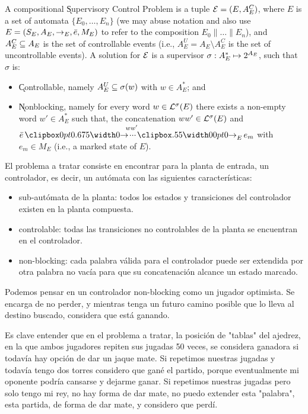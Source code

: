 \begin{definition} \label{def:control-problem}
	A compositional \k{Supervisory Control Problem} is a tuple $\mathcal{E} = (E, A_E^C)$, where $E$ is a set of automata $\{E_0,\ldots,E_n\}$ (we may abuse notation and also use $E = (S_E,A_E,\rightarrow_E,\bar{e},M_E)$ to refer to the composition $E_0\|\ldots\|E_n$), and $A_E^C \subseteq A_E$ is the set of controllable events (i.e., $A_E^U = A_E \setminus A_E^C$ is the set of uncontrollable events).
	A solution for $\mathcal{E}$ is a supervisor $\sigma : A_E^* \mapsto 2^{A_E}$, such that $\sigma$ is:
	\begin{itemize}[itemsep=4pt,topsep=-8pt]
		
		\item \k{Controllable}, namely $A_E^U \subseteq \sigma(w)$ with $w \in A_E^*$; and
		
		\item \k{Nonblocking}, namely for every word $w \in \mathcal{L}^\sigma(E)$ there exists a non-empty word $w' \in A_E^*$ such that, the concatenation $ww' \in \mathcal{L}^\sigma(E)$ and $\init{e} \runw{\;ww'}{E} e_m$ with $e_m \in M_E$ (i.e., a marked state of $E$).
		
	\end{itemize}
	
\end{definition}


El problema a tratar consiste en encontrar para la planta de entrada, un controlador, es decir, un autómata con las siguientes características:

\begin{itemize}
	\item sub-autómata de la planta: todos los estados y transiciones del controlador existen en la planta compuesta.
	
	\item controlable: todas las transiciones no controlables de la planta se encuentran en el controlador.
	
	\item non-blocking: cada palabra válida para el controlador puede ser extendida por otra palabra no vacía para que su concatenación alcance un estado marcado.
\end{itemize}

Podemos pensar en un controlador non-blocking como un jugador optimista. Se encarga de no perder, y mientras tenga un futuro camino posible que lo lleva al destino buscado, considera que está ganando.

Es clave entender que en el problema a tratar, la posición de "tablas" del ajedrez, en la que ambos jugadores repiten sus jugadas 50 veces, se considera ganadora si todavía hay opción de dar un jaque mate. Si repetimos nuestras jugadas y todavía tengo dos torres considero que gané el partido, porque eventualmente mi oponente podría cansarse y dejarme ganar. Si repetimos nuestras jugadas pero solo tengo mi rey, no hay forma de dar mate, no puedo extender esta "palabra", esta partida, de forma de dar mate, y considero que perdí.


